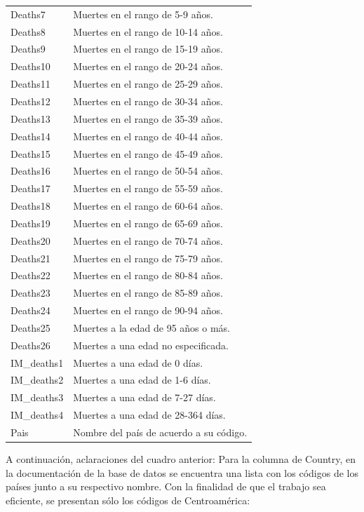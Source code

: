 \documentclass[
  letterpaper,
  DIV=11,
  numbers=noendperiod]{scrartcl}
\begin{document}
\begin{longtable}[]{@{}
  >{\raggedright\arraybackslash}p{}
  >{\raggedright\arraybackslash}p{}@{}}
Deaths7 & Muertes en el rango de 5-9 años. \\
Deaths8 & Muertes en el rango de 10-14 años. \\
Deaths9 & Muertes en el rango de 15-19 años. \\
Deaths10 & Muertes en el rango de 20-24 años. \\
Deaths11 & Muertes en el rango de 25-29 años. \\
Deaths12 & Muertes en el rango de 30-34 años. \\
Deaths13 & Muertes en el rango de 35-39 años. \\
Deaths14 & Muertes en el rango de 40-44 años. \\
Deaths15 & Muertes en el rango de 45-49 años. \\
Deaths16 & Muertes en el rango de 50-54 años. \\
Deaths17 & Muertes en el rango de 55-59 años. \\
Deaths18 & Muertes en el rango de 60-64 años. \\
Deaths19 & Muertes en el rango de 65-69 años. \\
Deaths20 & Muertes en el rango de 70-74 años. \\
Deaths21 & Muertes en el rango de 75-79 años. \\
Deaths22 & Muertes en el rango de 80-84 años. \\
Deaths23 & Muertes en el rango de 85-89 años. \\
Deaths24 & Muertes en el rango de 90-94 años. \\
Deaths25 & Muertes a la edad de 95 años o más. \\
Deaths26 & Muertes a una edad no especificada. \\
IM\_deaths1 & Muertes a una edad de 0 días. \\
IM\_deaths2 & Muertes a una edad de 1-6 días. \\
IM\_deaths3 & Muertes a una edad de 7-27 días. \\
IM\_deaths4 & Muertes a una edad de 28-364 días. \\
Pais & Nombre del país de acuerdo a su código. \\
\end{longtable}

A continuación, aclaraciones del cuadro anterior: Para la columna de
Country, en la documentación de la base de datos se encuentra una lista
con los códigos de los países junto a su respectivo nombre. Con la
finalidad de que el trabajo sea eficiente, se presentan sólo los códigos
de Centroamérica:
\end{document}
